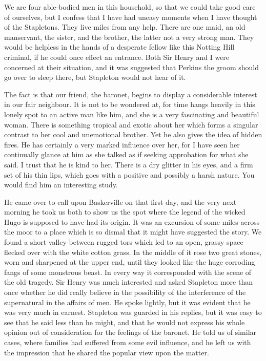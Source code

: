 \documentclass[paper=5.5in:8.5in,BCOR=7mm,twoside,DIV=calc,12pt,usegeometry,openany,chapterprefix,endperiod,headings=big]{scrbook} %
\begin{document}
We are four able-bodied men in this household, so that we could take good care of ourselves, but I confess that I have had uneasy moments when I have thought of the Stapletons. They live miles from any help. There are one maid, an old manservant, the sister, and the brother, the latter not a very strong man. They would be helpless in the hands of a desperate fellow like this Notting Hill criminal, if he could once effect an entrance. Both Sir Henry and I were concerned at their situation, and it was suggested that Perkins the groom should go over to sleep there, but Stapleton would not hear of it.

The fact is that our friend, the baronet, begins to display a considerable interest in our fair neighbour. It is not to be wondered at, for time hangs heavily in this lonely spot to an active man like him, and she is a very fascinating and beautiful woman. There is something tropical and exotic about her which forms a singular contrast to her cool and unemotional brother. Yet he also gives the idea of hidden fires. He has certainly a very marked influence over her, for I have seen her continually glance at him as she talked as if seeking approbation for what she said. I trust that he is kind to her. There is a dry glitter in his eyes, and a firm set of his thin lips, which goes with a positive and possibly a harsh nature. You would find him an interesting study.

He came over to call upon Baskerville on that first day, and the very next morning he took us both to show us the spot where the legend of the wicked Hugo is supposed to have had its origin. It was an excursion of some miles across the moor to a place which is so dismal that it might have suggested the story. We found a short valley between rugged tors which led to an open, grassy space flecked over with the white cotton grass. In the middle of it rose two great stones, worn and sharpened at the upper end, until they looked like the huge corroding fangs of some monstrous beast. In every way it corresponded with the scene of the old tragedy. Sir Henry was much interested and asked Stapleton more than once whether he did really believe in the possibility of the interference of the supernatural in the affairs of men. He spoke lightly, but it was evident that he was very much in earnest. Stapleton was guarded in his replies, but it was easy to see that he said less than he might, and that he would not express his whole opinion out of consideration for the feelings of the baronet. He told us of similar cases, where families had suffered from some evil influence, and he left us with the impression that he shared the popular view upon the matter.
\end{document}
